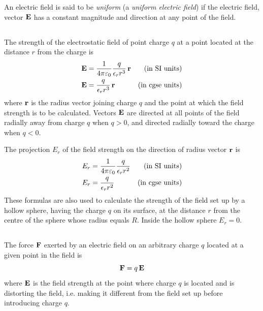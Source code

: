 An electric field is said to be \emph{uniform} (a \emph{uniform electric field}) if the electric field, vector $\vb{E}$ has a constant magnitude and direction at any point of the field.

\subsection{}\label{15.1.4} The strength of the electrostatic field of point charge $q$ at a point located at the distance $r$ from the charge is
\begin{align*}%
\vb{E} & = \frac{1}{\fpe} \frac{q}{\epsilon_{r} r^{3}} \,\vb{r} & \text{(in SI units)}\\
\vb{E} & = \frac{q}{\epsilon_{r} r^{3}}\, \vb{r} &\text{(in cgse units)}
\end{align*}
where $\vb{r}$ is the radius vector joining charge $q$ and the point at which the field strength is to be calculated. Vectors $\vb{E}$ are directed at all points of the field radially away from charge $q$ when $q > 0$, and directed radially toward the charge when $q < 0$.

The projection $E_{r}$ of the field strength on the direction of radius vector $\vb{r}$ is
\begin{align*}%
E_{r} & = \ofpe \frac{q}{\epsilon_{r} r^{2}} & \text{(in SI units)}\\
E_{r} & = \frac{q}{\epsilon_{r} r^{2}} &\text{(in cgse units)}
\end{align*}
These formulas are also used to calculate the strength of the field set up by a hollow sphere, having the charge $q$ on its surface, at the distance $r$ from the centre of the sphere whose radius equals $R$. Inside the hollow sphere $E_{r} = 0$.

\subsection{}\label{15.1.5} The force $\vb{F}$ exerted by an electric field on an arbitrary charge $q$ located at a given point in the field is
\begin{equation*}%
\vb{F} = q\,\vb{E}
\end{equation*}
where $\vb{E}$ is the field strength at the point where charge $q$ is located and is distorting the field, i.e. making it different from the field set up before introducing charge $q$.

